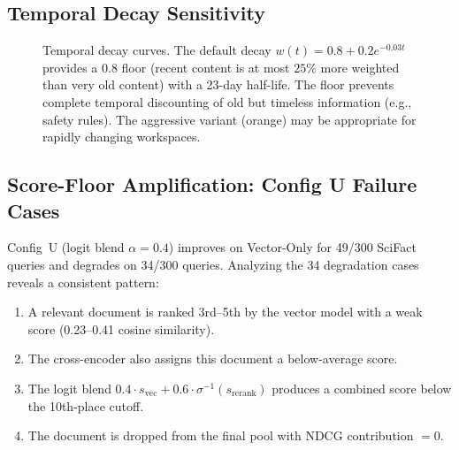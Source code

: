 \documentclass[11pt]{article}
\begin{document}
\subsection{Temporal Decay Sensitivity}

\begin{figure}[H]
\centering
{}
\caption{Temporal decay curves. The default decay $w(t) = 0.8 + 0.2e^{-0.03t}$
provides a 0.8 floor (recent content is at most $25\%$ more weighted than very old
content) with a 23-day half-life. The floor prevents complete temporal discounting of
old but timeless information (e.g., safety rules). The aggressive variant (orange) may
be appropriate for rapidly changing workspaces.}
\label{fig:temporal-decay}
\end{figure}

\subsection{Score-Floor Amplification: Config U Failure Cases}
\label{sec:eval:floor}

Config~U (logit blend $\alpha=0.4$) improves on Vector-Only for 49/300 SciFact queries
and degrades on 34/300 queries. Analyzing the 34 degradation cases reveals a consistent
pattern:

\begin{enumerate}[leftmargin=2em, itemsep=3pt]
  \item A relevant document is ranked 3rd--5th by the vector model with a weak score
  (0.23--0.41 cosine similarity).
  \item The cross-encoder also assigns this document a below-average score.
  \item The logit blend $0.4 \cdot s_{\text{vec}} + 0.6 \cdot \sigma^{-1}(s_{\text{rerank}})$
  produces a combined score below the 10th-place cutoff.
  \item The document is dropped from the final pool with NDCG contribution $= 0$.
\end{enumerate}
\end{document}
